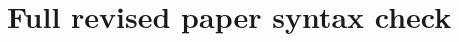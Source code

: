 \documentclass[11pt,a4paper]{article}
\begin{document}
\section*{Full revised paper syntax check}






\end{document}
